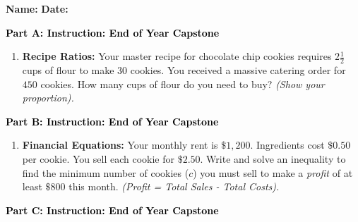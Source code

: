 \documentclass[12pt, letterpaper, fleqn]{article}
\begin{document}
\textbf{Name:} \underline{\hspace{5cm}}
\hfill
\textbf{Date:} \underline{\hspace{3cm}}\\

\begin{tcolorbox}[colback=customteal!20]
\large\textcolor{black}{\textbf{Part A: Instruction: End of Year Capstone}}
\end{tcolorbox}

\vspace{3mm}

\begin{enumerate}[itemsep=2.2cm, leftmargin=0.6cm]
\item \textbf{Recipe Ratios:} Your master recipe for chocolate chip cookies requires $2\frac{1}{2}$ cups of flour to make $30$ cookies. You received a massive catering order for $450$ cookies. How many cups of flour do you need to buy? \textit{(Show your proportion).}
\end{enumerate}

\newpage

\begin{tcolorbox}[colback=customteal!20]
\large\textcolor{black}{\textbf{Part B: Instruction: End of Year Capstone}}
\end{tcolorbox}

\vspace{3mm}

\begin{enumerate}[itemsep=2.2cm, leftmargin=0.6cm, resume]
\item \textbf{Financial Equations:} Your monthly rent is $\$1,200$. Ingredients cost $\$0.50$ per cookie. You sell each cookie for $\$2.50$. Write and solve an inequality to find the minimum number of cookies ($c$) you must sell to make a \textit{profit} of at least $\$800$ this month. \textit{(Profit = Total Sales - Total Costs).}
\end{enumerate}

\newpage

\begin{tcolorbox}[colback=customteal!20]
\large\textcolor{black}{\textbf{Part C: Instruction: End of Year Capstone}}
\end{tcolorbox}

\vspace{3mm}
\end{document}
